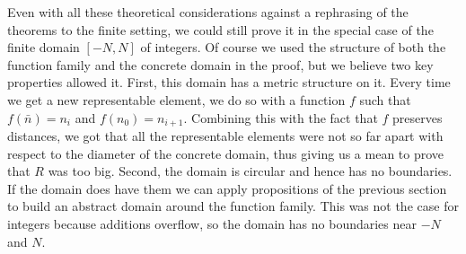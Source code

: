 Even with all these theoretical considerations against a rephrasing of the theorems to the finite setting, we could still prove it in the special case of the finite domain $[-N, N]$ of integers. Of course we used the structure of both the function family and the concrete domain in the proof, but we believe two key properties allowed it.
First, this domain has a metric structure on it. Every time we get a new representable element, we do so with a function $f$ such that $f(\bar{n}) = n_i$ and $f(n_0) = n_{i+1}$. Combining this with the fact that $f$ preserves distances, we got that all the representable elements were not so far apart with respect to the diameter of the concrete domain, thus giving us a mean to prove that $R$ was too big.
Second, the domain is circular and hence has no boundaries. If the domain does have them we can apply propositions of the previous section to build an abstract domain around the function family. This was not the case for integers because additions overflow, so the domain has no boundaries near $-N$ and $N$.

